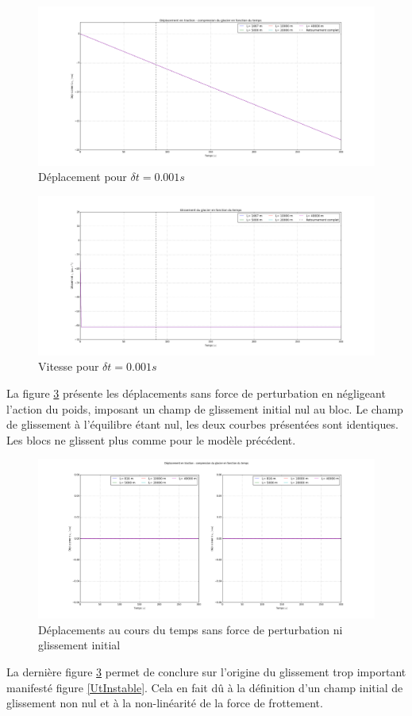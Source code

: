 \documentclass[11pt, a4paper]{article}
\begin{document}
\begin{figure}[h!]
	\centering
	\includegraphics[width=1\linewidth]{figures/Part1/DeplacementDt0001.png}
	\caption{Déplacement pour $\delta t= 0.001s$}
	\label{UtInstable2}
\end{figure}
\begin{figure}[h!]
	\centering
	\includegraphics[width=1\linewidth]{figures/Part1/VitesseDt0001.png}
	\caption{Vitesse pour $\delta t= 0.001s$}
	\label{UtdInstable2}
\end{figure}
La figure \ref{UtStableSansPoids} présente les déplacements sans force de perturbation en négligeant l'action du poids, imposant un champ de glissement initial nul au bloc. Le champ de glissement à l'équilibre étant nul, les deux courbes présentées sont identiques. Les blocs ne glissent plus comme pour le modèle précédent.
\\
 
\begin{figure}[h!]
    \centering
    \includegraphics[width=1\linewidth]{figures/Part1/DeplacementDt0012SansPoids.png}
    \caption{Déplacements au cours du temps sans force de perturbation ni glissement initial}
    \label{UtStableSansPoids}
\end{figure}
La dernière figure \ref{UtStableSansPoids} permet de conclure sur l'origine du glissement trop important manifesté figure \ref{UtInstable}. Cela en fait dû à la définition d'un champ initial de glissement non nul et à la non-linéarité de la force de frottement. 
\end{document}
